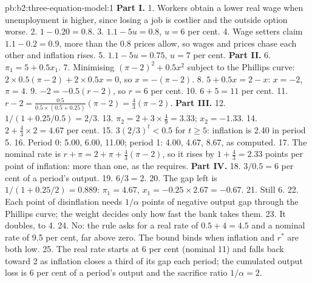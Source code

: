 \begin{solution}{pb:b2:three-equation-model:1}
\textbf{Part I.}
1. Workers obtain a lower real wage when unemployment is higher, since losing a job is costlier and the outside option worse.
2. $1 - 0.20 = 0.8$.
3. $1.1 - 5u = 0.8$, $u = 6$ per cent.
4. Wage setters claim $1.1 - 0.2 = 0.9$, more than the 0.8 prices allow, so wages and prices chase each other and inflation rises.
5. $1.1 - 5u = 0.75$, $u = 7$ per cent.
\textbf{Part II.}
6. $\pi_1 = 5 + 0.5x_1$.
7. Minimising $(\pi - 2)^2 + 0.5x^2$ subject to the Phillips curve: $2 \times 0.5(\pi - 2) + 2 \times 0.5x = 0$, so $x = -(\pi - 2)$.
8. $5 + 0.5x = 2 - x$: $x = -2$, $\pi = 4$.
9. $-2 = -0.5(r - 2)$, so $r = 6$ per cent.
10. $6 + 5 = 11$ per cent.
11. $r - 2 = \tfrac{0.5}{0.5 \times (0.5 + 0.25)}(\pi - 2) = \tfrac43(\pi - 2)$.
\textbf{Part III.}
12. $1/(1 + 0.25/0.5) = 2/3$.
13. $\pi_2 = 2 + 3 \times \tfrac49 = 3.33$; $x_2 = -1.33$.
14. $2 + \tfrac43 \times 2 = 4.67$ per cent.
15. $3(2/3)^t < 0.5$ for $t \geq 5$: inflation is 2.40 in period 5.
16. Period 0: 5.00, 6.00, 11.00; period 1: 4.00, 4.67, 8.67, as computed.
17. The nominal rate is $r + \pi = 2 + \pi + \tfrac43(\pi - 2)$, so it rises by $1 + \tfrac43 = 2.33$ points per point of inflation: more than one, as the  requires.
\textbf{Part IV.}
18. $3/0.5 = 6$ per cent of a period's output.
19. $6/3 = 2$.
20. The gap left is $1/(1 + 0.25/2) = 0.889$: $\pi_1 = 4.67$, $x_1 = -0.25 \times 2.67 = -0.67$.
21. Still 6.
22. Each point of disinflation needs $1/\alpha$ points of negative output gap through the Phillips curve; the weight decides only how fast the bank
takes them.
23. It doubles, to 4.
24. No: the rule asks for a real rate of $0.5 + 4 = 4.5$ and a nominal rate of 9.5 per cent, far above zero. The bound binds when inflation and $r^*$ are both low.
25. The real rate starts at 6 per cent (nominal 11) and falls back toward 2 as inflation closes a third of its gap each period; the
cumulated output loss is 6 per cent of a period's output and the sacrifice ratio $1/\alpha = 2$.
\end{solution}
